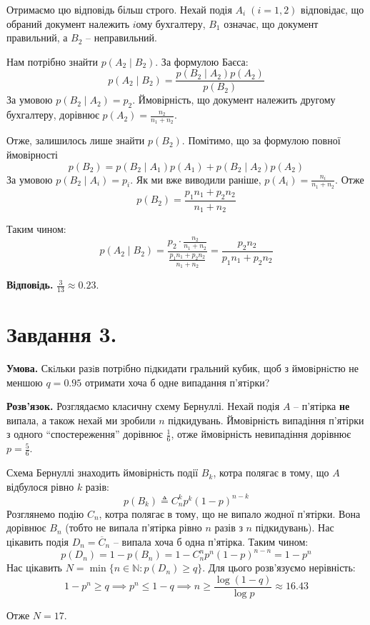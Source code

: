 \documentclass[12pt]{extarticle}
\begin{document}
Отримаємо цю відповідь більш строго. Нехай подія $A_i \; (i=1,2)$ відповідає, що обраний документ належить $i$ому бухгалтеру, $B_1$ означає, що документ правильний, а $B_2$ -- неправильний. 

Нам потрібно знайти $p(A_2 \mid B_2)$. За формулою Баєса:
\[
p(A_2 \mid B_2) = \frac{p(B_2 \mid A_2) p(A_2)}{p(B_2)}
\]
За умовою $p(B_2 \mid A_2) = p_2$. Ймовірність, що документ належить другому бухгалтеру, дорівнює $p(A_2)=\frac{n_2}{n_1+n_2}$.

Отже, залишилось лише знайти $p(B_2)$. Помітимо, що за формулою повної ймовірності
\[
p(B_2)=p(B_2 \mid A_1)p(A_1) + p(B_2 \mid A_2)p(A_2)
\]
За умовою $p(B_2 \mid A_i)=p_i$. Як ми вже виводили раніше, $p(A_i) = \frac{n_i}{n_1+n_2}$. Отже
\[
p(B_2) = \frac{p_1n_1 + p_2n_2}{n_1+n_2} 
\]

Таким чином:
\[
p(A_2 \mid B_2) = \frac{p_2 \cdot \frac{n_2}{n_1+n_2}}{\frac{p_1n_1+p_2n_2}{n_1+n_2}} = \frac{p_2n_2}{p_1n_1+p_2n_2}
\]

\textbf{Відповідь.} $\frac{3}{13} \approx 0.23$.

\pagebreak

\section*{Завдання 3.}

\textbf{Умова.} Скiльки разiв потрiбно пiдкидати гральний кубик, щоб з ймовiрнiстю не меншою $q=0.95$ отримати хоча б одне випадання п’ятiрки?

\textbf{Розв'язок.} Розглядаємо класичну схему Бернуллі. Нехай подія $A$ -- п'ятірка \textbf{не} випала, а також нехай ми зробили $n$ підкидувань. Ймовірність випадіння п'ятірки з одного ``спостереження'' дорівнює $\frac{1}{6}$, отже ймовірність невипадіння дорівнює $p=\frac{5}{6}$. 

Схема Бернуллі знаходить ймовірність події $B_k$, котра полягає в тому, що $A$ відбулося рівно $k$ разів:
\[
p(B_k) \triangleq C_n^k p^k (1-p)^{n-k}
\]
Розглянемо подію $C_n$, котра полягає в тому, що не випало жодної п'ятірки. Вона дорівнює $B_n$ (тобто не випала п'ятірка рівно $n$ разів з $n$ підкидувань). Нас цікавить подія $D_n=\overline{C}_n$ -- випала хоча б одна п'ятірка. Таким чином:
\[
p(D_n) = 1 - p(B_n) = 1 - C_n^np^n(1-p)^{n-n} = 1 - p^n
\]
Нас цікавить $N=\min \{n \in \mathbb{N}: p(D_n) \geq q\}$. Для цього розв'язуємо нерівність:
\[
1 - p^n \geq q \implies p^n \leq 1-q \implies n \geq \frac{\log(1-q)}{\log p} \approx 16.43
\]

Отже $N = 17$.
\end{document}
